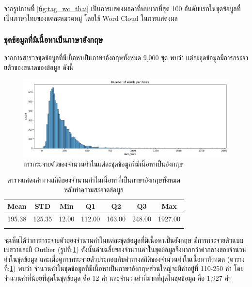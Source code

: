 \documentclass[12pt,oneside,openright,a4paper]{cpe-thai-project}
\begin{document}
        \hspace{1cm}จากรูปภาพที่ \ref{fig:tag_wc_thai} เป็นการแสดงผลคำที่พบมากที่สุด 100 อันดับแรกในชุดข้อมูลที่เป็นภาษาไทยของแต่ละหมวดหมู่ โดยใช้ Word Cloud ในการแสดงผล
        \newpage

      \subsubsection{ชุดข้อมูลที่มีเนื้อหาเป็นภาษาอังกฤษ}
        \hspace{1cm}จากการสำรวจชุดข้อมูลที่มีเนื้อหาเป็นภาษาอังกฤษทั้งหมด 9,000 ชุด พบว่า แต่ละชุดข้อมูลมีการกระจายตัวของขนาดของข้อมูล \newline ดังนี้
        \begin{figure}[!ht]\centering
          \includegraphics[width=\textwidth]{./img/eng_stat/hist_all_word.png}
          \caption{การกระจายตัวของจำนวนคำในแต่ละชุดข้อมูลที่มีเนื้อหาเป็นอังกฤษ}\label{fig:eng_hist}
        \end{figure}
        \begin{longtable}[!ht]{ccccccc}
          \caption{ตารางแสดงค่าทางสถิติของจำนวนคำในเนื้อหาที่เป็นภาษาอังกฤษทั้งหมดหลังทําความสะอาดข้อมูล}
          \label{tbl:eng_stat_all}\\
          \hhline{=======}
          \textbf{Mean} & \textbf{STD} & \textbf{Min} & \textbf{Q1} & \textbf{Q2} & \textbf{Q3} & \textbf{Max}\\ \hline
          \endhead
          195.38 & 125.35 & 12.00 & 112.00 & 163.00 & 248.00 & 1927.00  \\ \hhline{=======}
        \end{longtable}
        \hspace{1cm}จะเห็นได้ว่าการกระจายตัวของจำนวนคำในแต่ละชุดข้อมูลที่มีเนื้อหาเป็นอังกฤษ มีการกระจายตัวแบบเบ้ขวาและมี Outlier (รูปที่:\ref{fig:eng_hist}) 
        ดังนั้นค่าเฉลี่ยของจำนวนคำในชุดข้อมูลจึงมากกว่าค่ากลางของจำนวนคำในชุดข้อมูล และเมื่อดูการกระจายตัวประกอบกับค่าทางสถิติของจำนวนคำในเนื้อหาทั้งหมด
        (ตารางที่:\ref{tbl:eng_stat_all}) พบว่า จำนวนคำในชุดข้อมูลที่มีเนื้อหาเป็นภาษาอังกฤษส่วนใหญ่จะมีค่าอยู่ที่ 110-250 คำ โดยจำนวนคำที่น้อยที่สุดในชุดข้อมูล คือ 12 คำ
        และจำนวนคำที่มากที่สุดในชุดข้อมูล คือ 1,927 คำ
\end{document}
